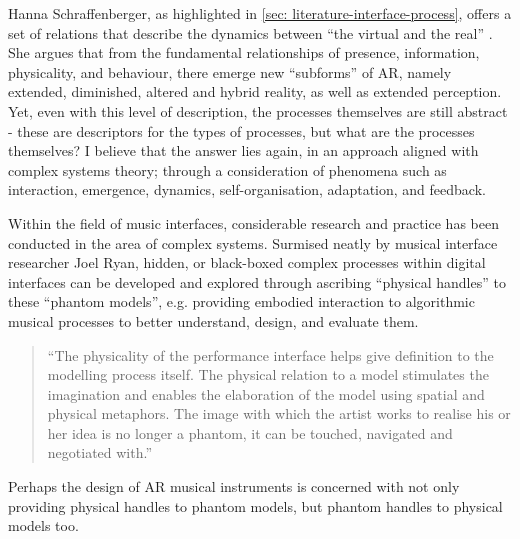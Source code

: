 Hanna Schraffenberger, as highlighted in \autoref{sec: literature-interface-process}, offers a set of relations that describe the dynamics between “the virtual and the real” \citeyearpar{schraffenberger2018}. She argues that from the fundamental relationships of presence, information, physicality, and behaviour, there emerge new “subforms” of AR, namely extended, diminished, altered and hybrid reality, as well as extended perception. Yet, even with this level of description, the processes themselves are still abstract - these are descriptors for the types of processes, but what are the processes themselves? I believe that the answer lies again, in an approach aligned with complex systems theory; through a consideration of phenomena such as interaction, emergence, dynamics, self-organisation, adaptation, and feedback.

Within the field of music interfaces, considerable research and practice has been conducted in the area of complex systems. Surmised neatly by musical interface researcher Joel Ryan, hidden, or black-boxed complex processes within digital interfaces can be developed and explored through ascribing “physical handles” to these “phantom models”, e.g. providing embodied interaction to algorithmic musical processes to better understand, design, and evaluate them.
\begin{quote}
    “The physicality of the performance interface helps give definition to the modelling process itself. The physical relation to a model stimulates the imagination and enables the elaboration of the model using spatial and physical metaphors. The image with which the artist works to realise his or her idea is no longer a phantom, it can be touched, navigated and negotiated with.” \citeyearpar[p.5]{ryan1991}
\end{quote}
Perhaps the design of AR musical instruments is concerned with not only providing physical handles to phantom models, but phantom handles to physical models too.

